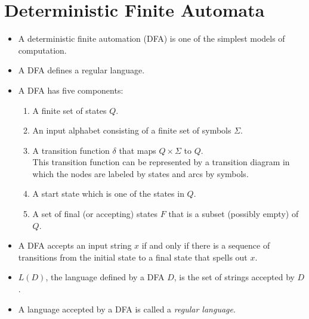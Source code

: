 \documentclass[]{article}
\begin{document}
\section{Deterministic Finite Automata}
  \begin{itemize}
    \item A deterministic finite automation (DFA) is one of the simplest
    models of computation.
    \item A DFA defines a regular language.
    \item A DFA has five components:
      \begin{enumerate}
        \item A finite set of states $Q$.
        \item An input alphabet consisting of a finite set of symbols
        $\Sigma$.
        \item A transition function $\delta$ that maps $Q \times \Sigma$ to
        $Q$.\\
        This transition function can be represented by a transition diagram in
        which the nodes are labeled by states and arcs by symbols.
        \item A start state which is one of the states in $Q$.
        \item A set of final (or accepting) states $F$ that is a subset
        (possibly empty) of $Q$.
      \end{enumerate}
    \item A DFA accepts an input string $x$ if and only if there is a sequence
    of transitions from the initial state to a final state that spells out
    $x$.
    \item $L(D)$, the language defined by a DFA $D$, is the set of strings
    accepted by $D$.
    \item A language accepted by a DFA is called a \emph{regular language}.
  \end{itemize}
\end{document}
